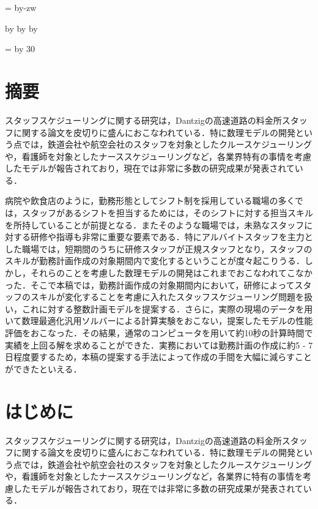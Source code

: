 \documentclass[11pt]{jsarticle}
\makeatletter
\def\mojiparline#1{
    \newcounter{mpl}
    \setcounter{mpl}{#1}
    \@tempdima=\linewidth
    \advance\@tempdima by-\value{mpl}zw
    \addtocounter{mpl}{-1}
    \divide\@tempdima by \value{mpl}
    \advance\kanjiskip by\@tempdima
    \advance\parindent by\@tempdima
}
\def\linesparpage#1{
    \baselineskip=\textheight
    \divide\baselineskip by #1
}
\makeatother
\begin{document}
\mojiparline{35}
\linesparpage{30}

\section*{摘要}
スタッフスケジューリングに関する研究は，Dantzigの高速道路の料金所スタッフに関する論文を皮切りに盛んにおこなわれている．特に数理モデルの開発という点では，鉄道会社や航空会社のスタッフを対象としたクルースケジューリングや，看護師を対象としたナーススケジューリングなど，各業界特有の事情を考慮したモデルが報告されており，現在では非常に多数の研究成果が発表されている．

病院や飲食店のように，勤務形態としてシフト制を採用している職場の多くでは，スタッフがあるシフトを担当するためには，そのシフトに対する担当スキルを所持していることが前提となる．またそのような職場では，未熟なスタッフに対する研修や指導も非常に重要な要素である．特にアルバイトスタッフを主力とした職場では，短期間のうちに研修スタッフが正規スタッフとなり，スタッフのスキルが勤務計画作成の対象期間内で変化するということが度々起こりうる．しかし，それらのことを考慮した数理モデルの開発はこれまでおこなわれてこなかった．そこで本稿では，勤務計画作成の対象期間内において，研修によってスタッフのスキルが変化することを考慮に入れたスタッフスケジューリング問題を扱い，これに対する整数計画モデルを提案する．さらに，実際の現場のデータを用いて数理最適化汎用ソルバーによる計算実験をおこない，提案したモデルの性能評価をおこなった．その結果，通常のコンピュータを用いて約10秒の計算時間で実績を上回る解を求めることができた．実務においては勤務計画の作成に約5 - 7日程度要するため，本稿の提案する手法によって作成の手間を大幅に減らすことができたといえる．

\thispagestyle{empty}
\newpage

\tableofcontents
{}
\newpage

\setcounter{page}{1}
\section{はじめに}
スタッフスケジューリングに関する研究は，Dantzigの高速道路の料金所スタッフに関する論文\cite{bib:dantzig}を皮切りに盛んにおこなわれている．特に数理モデルの開発という点では，鉄道会社や航空会社のスタッフを対象としたクルースケジューリング\cite{bib:air}や，看護師を対象としたナーススケジューリング\cite{bib:nurse_1, bib:nurse_2}など，各業界に特有の事情を考慮したモデルが報告されており，現在では非常に多数の研究成果が発表されている\cite{bib:survey_1, bib:survey_2}．
\end{document}
